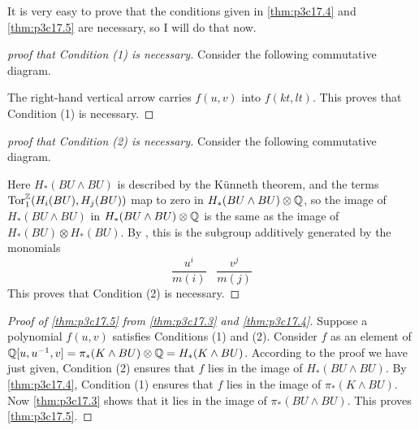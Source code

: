 \documentclass[../main]{subfiles}
\begin{document}
It is very easy to prove that the conditions given in \ref{thm:p3c17.4} and \ref{thm:p3c17.5} are necessary, so I will do that now.
\begin{proof}[proof that Condition (1) is necessary]
Consider the following commutative diagram.


The right-hand vertical arrow carries $f(u,v)$ into $f(kt,lt)$. This proves that Condition (1) is necessary.
\end{proof}
\begin{proof}[proof that Condition (2) is necessary]
Consider the following commutative diagram.


Here $H_*({BU}\wedge{BU})$ is described by the K\"unneth theorem, and the terms $\operatorname{\mathop{\mathrm{Tor}}}^{\mathbb{Z}}_1(H_i({BU}),H_j({BU}))$ map to zero in $H_*({BU}\wedge{BU})\otimes\mathbb{Q}$, so the image of $H_*({BU}\wedge{BU})$ in $H_*({BU}\wedge{BU})\otimes\mathbb{Q}$ is the same as the image of $H_*({BU})\otimes H_*({BU})$. By , this is the subgroup additively generated by the monomials
\[
\frac{u^i}{m(i)}\;\;\;\frac{v^j}{m(j)}
\]
This proves that Condition (2) is necessary.
\end{proof}
\begin{proof}[Proof of \ref{thm:p3c17.5} from \ref{thm:p3c17.3} and \ref{thm:p3c17.4}]
Suppose a polynomial $f(u,v)$ satisfies Conditions (1) and (2). Consider $f$ as an element of $\mathbb{Q}[u,u^{-1},v] = \pi_*(K\wedge{BU})\otimes\mathbb{Q} = H_*(K\wedge{BU})$. According to the proof we have just given, Condition (2) ensures that $f$ lies in the image of $H_*({BU}\wedge{BU})$. By \ref{thm:p3c17.4}, Condition (1) ensures that $f$ lies in the image of $\pi_*(K\wedge{BU})$. Now \ref{thm:p3c17.3} shows that it lies in the image of $\pi_*({BU}\wedge{BU})$. This proves \ref{thm:p3c17.5}.
\end{proof}
\end{document}
